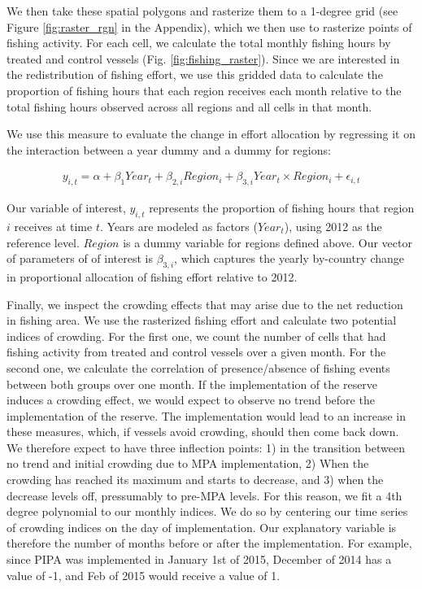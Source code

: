 \documentclass[9p,twocolumn,twoside,lineno]{pnas-new}
\begin{document}
We then take these spatial polygons and rasterize them to a 1-degree grid
(see Figure \ref{fig:raster_rgn} in the Appendix), which we then use to rasterize points
of fishing activity. For each cell, we calculate the total monthly
fishing hours by treated and control vessels (Fig. \ref{fig:fishing_raster}).
Since we are interested in the redistribution
of fishing effort, we use this gridded data to calculate the proportion
of fishing hours that each region receives each month relative to the
total fishing hours observed across all regions and all cells in that
month.

We use this measure to evaluate the change in effort allocation by
regressing it on the interaction between a year dummy and a dummy for
regions:

\begin{figure}[h]
\begin{align*}
y_{i,t} = \alpha + \beta_1Year_t + \beta_{2,i}Region_i + \beta_{3,i}Year_t \times Region_i+ \epsilon_{i,t}
\end{align*}
\end{figure}


Our variable of interest, $y_{i,t}$ represents the proportion of
fishing hours that region $i$ receives at time $t$. Years are
modeled as factors ($Year_t$), using 2012 as the reference level.
$Region$ is a dummy variable for regions defined above. Our vector of parameters of
of interest is $\beta_{3,i}$, which captures the yearly by-country
change in proportional allocation of fishing effort relative to 2012.

Finally, we inspect the crowding effects that may arise due to the net reduction
in fishing area. We use the rasterized fishing effort and calculate two
potential indices of crowding. For the first one, we count the number of cells
that had fishing activity from treated and control vessels over a given month. For the second one,
we calculate the correlation of presence/absence of fishing events between both groups
over one month. If the implementation of the reserve induces a crowding effect,
we would expect to observe no trend before the implementation of the reserve.
The implementation would lead to an increase in these measures, which, 
if vessels avoid crowding, should then come back down. We therefore expect to
have three inflection points: 1) in the transition between no trend and initial crowding due to MPA
implementation, 2) When the crowding has reached its maximum and starts to decrease,
and 3) when the decrease levels off, pressumably to pre-MPA levels.
For this reason, we fit a 4th degree polynomial to our monthly indices. We do so by
centering our time series of crowding indices on the day of implementation. Our
explanatory variable is therefore the number of months before or after the implementation.
For example, since PIPA was implemented in January 1st of 2015, December of 2014 
has a value of -1, and Feb of 2015 would receive a value of 1.
\end{document}
